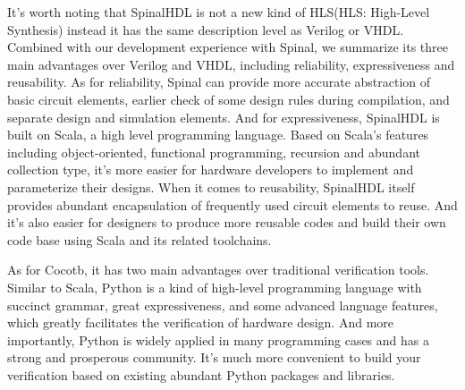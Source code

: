 \documentclass{article}
\begin{document}
It’s worth noting that SpinalHDL is not a new kind of HLS(HLS: High-Level Synthesis) instead it has the same description level as Verilog or VHDL. Combined with our development experience with Spinal, we summarize its three main advantages over Verilog and VHDL, including reliability, expressiveness and reusability. As for reliability, Spinal can provide more accurate abstraction of basic circuit elements, earlier check of some design rules during compilation, and separate design and simulation elements. And for expressiveness, SpinalHDL is built on Scala, a high level programming language. Based on Scala’s features including object-oriented, functional programming, recursion and abundant collection type, it’s more easier for hardware developers to implement and parameterize their designs. When it comes to reusability, SpinalHDL itself provides abundant encapsulation of frequently used circuit elements to reuse. And it’s also easier for designers to produce more reusable codes and build their own code base using Scala and its related toolchains. 

As for Cocotb, it has two main advantages over traditional verification tools. Similar to Scala, Python is a kind of high-level programming language with succinct grammar, great expressiveness, and some advanced language features, which greatly facilitates the verification of hardware design. And more importantly, Python is widely applied in many programming cases and has a strong and prosperous community. It’s much more convenient to build your verification based on existing abundant Python packages and libraries. 


\end{document}
